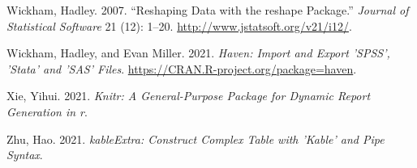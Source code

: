 \documentclass[
]{article}
\newlength{\cslhangindent}
\newlength{\cslentryspacingunit} %
\newenvironment{CSLReferences}[2] %
 {%
  \setlength{\parindent}{0pt}
  \ifodd #1
  \let\oldpar\par
  \def\par{\hangindent=\cslhangindent\oldpar}
  \fi
  \setlength{\parskip}{#2\cslentryspacingunit}
 }%
 {}
\begin{document}
\begin{CSLReferences}{1}{0}
\leavevmode{}%
Wickham, Hadley. 2007. {``Reshaping Data with the {reshape} Package.''}
\emph{Journal of Statistical Software} 21 (12): 1--20.
\url{http://www.jstatsoft.org/v21/i12/}.

\leavevmode{}%
Wickham, Hadley, and Evan Miller. 2021. \emph{Haven: Import and Export
'SPSS', 'Stata' and 'SAS' Files}.
\url{https://CRAN.R-project.org/package=haven}.

\leavevmode{}%
Xie, Yihui. 2021. \emph{Knitr: A General-Purpose Package for Dynamic
Report Generation in r}.

\leavevmode{}%
Zhu, Hao. 2021. \emph{kableExtra: Construct Complex Table with 'Kable'
and Pipe Syntax}.

\end{CSLReferences}
\end{document}
